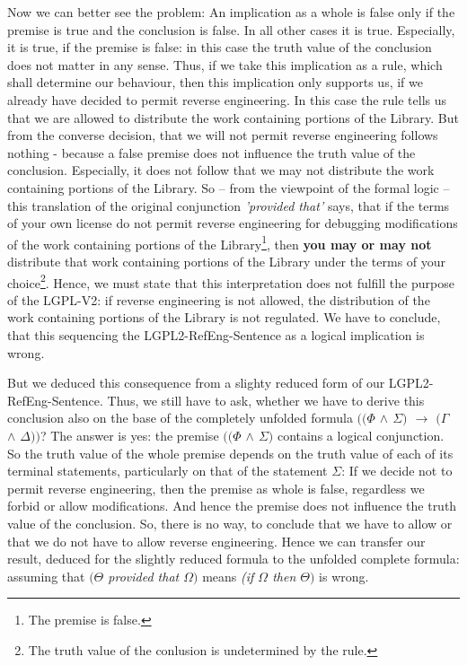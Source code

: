 Now we can better see the problem: An implication as a whole is false only if
the premise is true and the conclusion is false. In all other cases it is true.
Especially, it is true, if the premise is false: in this case the truth value of
the conclusion does not matter in any sense. Thus, if we take this implication
as a rule, which shall determine our behaviour, then this implication only
supports us, if we already have decided to permit reverse engineering. In this
case the rule tells us that we are allowed to distribute the work containing
portions of the Library. But from the converse decision, that we will not permit
reverse engineering follows nothing - because a false premise does not influence
the truth value of the conclusion. Especially, it does not follow that we may
not distribute the work containing portions of the Library. So -- from the
viewpoint of the formal logic -- this translation of the original conjunction 
\emph{'provided that'} says, that if the terms of your own license do not permit
reverse engineering for debugging modifications of the work containing portions
of the Library\footnote{The premise is false.}, then \textbf{you may or may not}
distribute that work containing portions of the Library under the terms of your
choice\footnote{The truth value of the conlusion is undetermined by the rule.}.
Hence, we must state that this interpretation does not fulfill the purpose of
the LGPL-V2: if reverse engineering is not allowed, the distribution of the work
containing portions of the Library is not regulated. We have to conclude, that
this sequencing the LGPL2-RefEng-Sentence as a logical implication is wrong.

But we deduced this consequence from a slighty reduced form of our
LGPL2-RefEng-Sentence. Thus, we still have to ask, whether we have to derive
this conclusion also on the base of the completely unfolded formula
\emph{$((\Phi$ $\wedge$ $\Sigma)$ $\rightarrow$ $(\Gamma$ $\wedge$ $\Delta))$}?
The answer is yes: the premise \emph{$((\Phi$ $\wedge$ $\Sigma)$} contains a
logical conjunction. So the truth value of the whole premise depends on the
truth value of each of its terminal statements, particularly on that of the
statement $\Sigma$: If we decide not to permit reverse engineering, then the
premise as whole is false, regardless we forbid or allow modifications. And
hence the premise does not influence the truth value of the conclusion. So,
there is no way, to conclude that we have to allow or that we do not have to
allow reverse engineering. Hence we can transfer our result, deduced for the
slightly reduced formula to the unfolded complete formula: assuming that
\emph{$(\Theta$ provided that $\Omega)$} means \emph{(if $\Omega$ then
$\Theta)$} is wrong.

